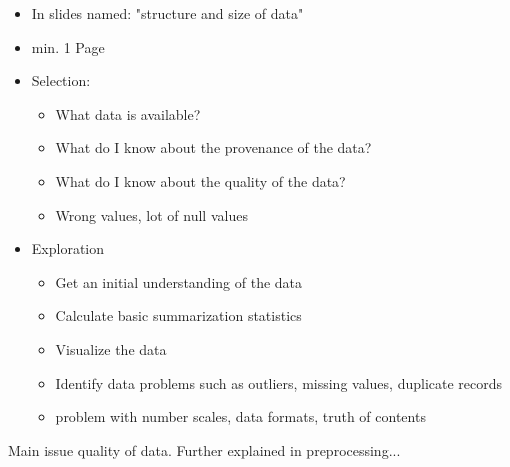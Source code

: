 \begin{itemize}
	\item In slides named: "structure and size of data"
	\item min. 1 Page
	\item Selection: 
	\begin{itemize}
		\item What data is available?
		\item What do I know about the provenance of the data?
		\item What do I know about the quality of the data?
		\item Wrong values, lot of null values
	\end{itemize}
	\item Exploration
	\begin{itemize}
		\item Get an initial understanding of the data
		\item Calculate basic summarization statistics
		\item Visualize the data
		\item Identify data problems such as outliers, missing values, duplicate records
		\item problem with number scales, data formats, truth of contents
	\end{itemize}
\end{itemize}

Main issue quality of data. Further explained in preprocessing...
